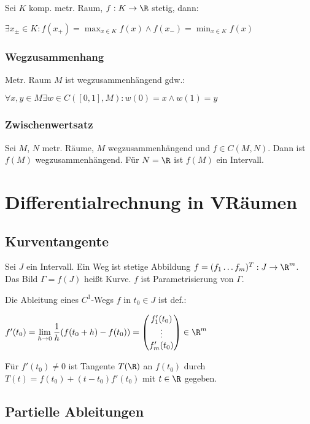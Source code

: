 Sei $K$ komp. metr. Raum, $f: K \rightarrow \R$ stetig, dann:

$\exists x_{\pm} \in K : f(x_+) = \displaystyle\max_{x \in K} f(x) \land f(x_-) = \displaystyle\min_{x \in K} f(x)$

\subsubsection*{Wegzusammenhang}

Metr. Raum $M$ ist wegzusammenhängend gdw.:

$\forall x, y \in M \exists w \in C([0,1], M) : w(0) = x \land w(1) = y$

\subsubsection*{Zwischenwertsatz}

Sei $M$, $N$ metr. Räume, $M$ wegzusammenhängend und $f \in C(M, N)$. Dann ist $f(M)$ wegzusammenhängend. Für $N = \R$ ist $f(M)$ ein Intervall.

\section*{Differentialrechnung in VRäumen}

\subsection*{Kurventangente}

Sei $J$ ein Intervall. Ein Weg ist stetige Abbildung $f = (f_1 \hdots f_m)^T : J \rightarrow \R^m$. Das Bild $\Gamma = f(J)$ heißt Kurve. $f$ ist Parametrisierung von $\Gamma$.

Die Ableitung eines $C^1$-Wegs $f$ in $t_0 \in J$ ist def.:

$f'(t_0) = \displaystyle\lim_{h \to 0} \frac{1}{h} (f(t_0 + h) - f(t_0)) = \begin{pmatrix} f_1'(t_0) \\ \vdots \\ f_m'(t_0)\end{pmatrix} \in \R^m$

Für $f'(t_0) \neq 0$ ist Tangente $T(\R)$ an $f(t_0)$ durch $T(t) = f(t_0) + (t - t_0)f'(t_0)$ mit $t \in \R$ gegeben.

\subsection*{Partielle Ableitungen}

